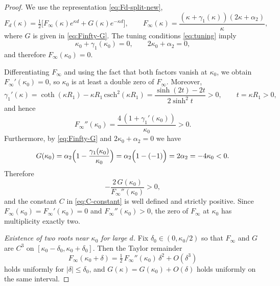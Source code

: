\documentclass[a4paper,11pt]{article}
\numberwithin{equation}{section}
\theoremstyle{definition}
\theoremstyle{remark}
\begin{document}
\begin{proof}
We use the representation \eqref{eq:Fd-split-new},
$$
F_d(\kappa)=\tfrac12\bigl[F_\infty(\kappa)e^{\kappa d}+G(\kappa)e^{-\kappa d}\bigr],
\qquad
F_\infty(\kappa)=\frac{(\kappa+\gamma_1(\kappa))(2\kappa+\alpha_2)}{\kappa},
$$
where $G$ is given in \eqref{eq:Finfty-G}.
The tuning conditions \eqref{eq:tuning} imply
$$
\kappa_0+\gamma_1(\kappa_0)=0,\qquad 2\kappa_0+\alpha_2=0,
$$
and therefore $F_\infty(\kappa_0)=0$.

Differentiating $F_\infty$ and using the fact that both factors vanish at
$\kappa_0$, we obtain $F_\infty'(\kappa_0)=0$, so $\kappa_0$ is at least a
double zero of $F_\infty$.
Moreover,
$$
\gamma_1'(\kappa)=\coth(\kappa R_1)-\kappa R_1\,\mathrm{csch}^2(\kappa R_1)
=\frac{\sinh(2t)-2t}{2\sinh^2 t}>0,
\qquad t=\kappa R_1>0,
$$
and hence
$$
F_\infty''(\kappa_0)=\frac{4\,(1+\gamma_1'(\kappa_0))}{\kappa_0}>0.
$$
Furthermore, by \eqref{eq:Finfty-G} and $2\kappa_0+\alpha_2=0$ we have
$$
G(\kappa_0)=\alpha_2\Bigl(1-\frac{\gamma_1(\kappa_0)}{\kappa_0}\Bigr)
=\alpha_2\Bigl(1-(-1)\Bigr)=2\alpha_2=-4\kappa_0<0.
$$
Therefore
$$
-\frac{2\,G(\kappa_0)}{F_\infty''(\kappa_0)}>0,
$$
and the constant $C$ in \eqref{eq:C-constant} is well defined and strictly
positive.
Since $F_\infty(\kappa_0)=F_\infty'(\kappa_0)=0$ and $F_\infty''(\kappa_0)>0$,
the zero of $F_\infty$ at $\kappa_0$ has multiplicity exactly two.

\medskip
\noindent
\emph{Existence of two roots near $\kappa_0$ for large $d$.}
Fix $\delta_0\in(0,\kappa_0/2)$ so that $F_\infty$ and $G$ are $C^3$ on
$[\kappa_0-\delta_0,\kappa_0+\delta_0]$.
Then the Taylor remainder
\begin{equation}\label{eq:Finf-unif-Taylor}
F_\infty(\kappa_0+\delta)
=\tfrac12\,F_\infty''(\kappa_0)\,\delta^2+O(\delta^3)
\end{equation}
holds uniformly for $|\delta|\le\delta_0$, and
$G(\kappa)=G(\kappa_0)+O(\delta)$ holds uniformly on the same interval.


\end{proof}
\end{document}
